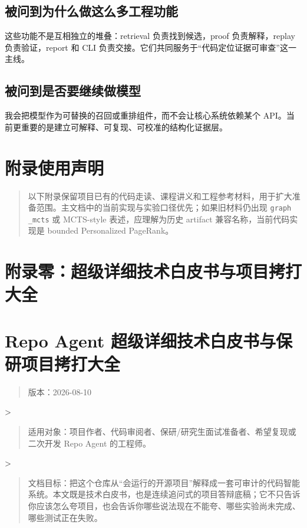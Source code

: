 \documentclass[UTF8,12pt,openany]{ctexbook}
\begin{document}
\section{被问到为什么做这么多工程功能}

这些功能不是互相独立的堆叠：retrieval 负责找到候选，proof 负责解释，replay 负责验证，report 和 CLI 负责交接。它们共同服务于“代码定位证据可审查”这一主线。\par

\section{被问到是否要继续做模型}

我会把模型作为可替换的召回或重排组件，而不会让核心系统依赖某个 API。当前更重要的是建立可解释、可复现、可校准的结构化证据层。\par


\clearpage
\chapter{附录使用声明}

\begin{quote}
以下附录保留项目已有的代码走读、课程讲义和工程参考材料，用于扩大准备范围。主文档中的当前实现与实验口径优先；如果旧材料仍出现 \texttt{graph\\_mcts} 或 MCTS-style 表述，应理解为历史 artifact 兼容名称，当前代码实现是 bounded Personalized PageRank。
\end{quote}


\clearpage
\chapter{附录零：超级详细技术白皮书与项目拷打大全}

\clearpage
\chapter{Repo Agent 超级详细技术白皮书与保研项目拷打大全}

\begin{quote}
版本：2026-08-10
\end{quote}
>\par
\begin{quote}
适用对象：项目作者、代码审阅者、保研/研究生面试准备者、希望复现或二次开发 Repo Agent 的工程师。
\end{quote}
>\par
\begin{quote}
文档目标：把这个仓库从“会运行的开源项目”解释成一套可审计的代码智能系统。本文既是技术白皮书，也是连续追问式的项目答辩底稿；它不只告诉你应该怎么夸项目，也会告诉你哪些说法现在不能夸、哪些实验尚未完成、哪些测试正在失败。
\end{quote}
\end{document}
